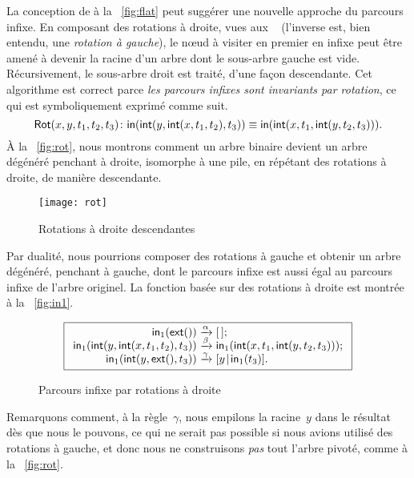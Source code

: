 La conception de
 à la
\fig~\vref{fig:flat} peut suggérer une nouvelle approche du parcours
infixe. En composant des rotations à droite, vues aux \figs~
(l'inverse est, bien entendu, une \emph{rotation à gauche}), le
n{\oe}ud à visiter en premier en infixe peut être amené à devenir la
racine d'un arbre dont le sous-arbre gauche est vide. Récursivement,
le sous-arbre droit est traité, d'une façon descendante. Cet
algorithme est correct parce \emph{les parcours infixes sont
  invariants par rotation}, ce qui est symboliquement exprimé comme
suit.
\begin{equation*}
\pred{Rot}{x,y,t_1,t_2,t_3} \colon
\fun{in}(\fun{int}(y,\fun{int}(x,t_1,t_2),t_3))
\equiv
\fun{in}(\fun{int}(x,t_1,\fun{int}(y,t_2,t_3))).\index{in@\fun{in/1}}
\label{def:Rot}
\end{equation*}
À la \fig~\vref{fig:rot}, nous montrons comment un arbre binaire
devient un arbre dégénéré
penchant à droite, isomorphe à une pile, en répétant des rotations à
droite, de manière descendante.
\begin{figure}[b]
\centering
\texttt{[image: rot]}
\caption{Rotations à droite descendantes\label{fig:rot}}
\end{figure}
Par dualité, nous pourrions composer des rotations à gauche et obtenir
un arbre dégénéré, penchant à gauche, dont le parcours infixe est
aussi égal au parcours infixe de l'arbre originel. La fonction
 basée sur des rotations à
droite est montrée à la \fig~\vref{fig:in1}.
\begin{figure}
\begin{equation*}
\boxed{
\begin{array}{r@{\;}c@{\;}l}
\fun{in}_1(\fun{ext}()) & \xrightarrow{\smash{\alpha}} & \el;\\
\fun{in}_1(\fun{int}(y,\fun{int}(x,t_1,t_2),t_3))
  & \xrightarrow{\smash{\beta}} & \fun{in}_1(\fun{int}(x,t_1,\fun{int}(y,t_2,t_3)));\\
\fun{in}_1(\fun{int}(y,\fun{ext}(),t_3))
  & \xrightarrow{\smash{\gamma}} & \cons{y}{\fun{in}_1(t_3)}.
\end{array}}
\end{equation*}
\caption{Parcours infixe par rotations à droite\label{fig:in1}}
\end{figure}
Remarquons comment, à la règle~\(\gamma\), nous empilons la
racine~\(y\) dans le résultat dès que nous le pouvons, ce qui ne
serait pas possible si nous avions utilisé des rotations à gauche, et
donc nous ne construisons \emph{pas} tout l'arbre pivoté, comme à la
\fig~\vref{fig:rot}.

